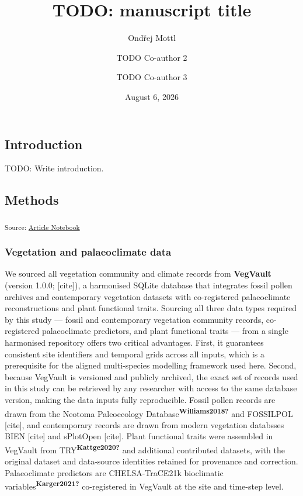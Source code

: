 \documentclass[
  12pt,
]{article}
\title{TODO: manuscript title}
\author{Ondřej Mottl \and TODO Co-author 2 \and TODO Co-author 3}
\date{August 6, 2026}
\begin{document}
\maketitle


\subsection{Introduction}\label{introduction}

TODO: Write introduction.

\subsection{Methods}\label{methods}

\textsubscript{Source:
\href{https://OndrejMottl.github.io/BIODYNAMICS-vegetation-cooccurrence/manuscript.qmd.html}{Article
Notebook}}

\subsubsection{Vegetation and palaeoclimate
data}\label{vegetation-and-palaeoclimate-data}

We sourced all vegetation community and climate records from
\textbf{VegVault} (version 1.0.0; {[}cite{]}), a harmonised SQLite
database that integrates fossil pollen archives and contemporary
vegetation datasets with co-registered palaeoclimate reconstructions and
plant functional traits. Sourcing all three data types required by this
study --- fossil and contemporary vegetation community records,
co-registered palaeoclimate predictors, and plant functional traits ---
from a single harmonised repository offers two critical advantages.
First, it guarantees consistent site identifiers and temporal grids
across all inputs, which is a prerequisite for the aligned multi-species
modelling framework used here. Second, because VegVault is versioned and
publicly archived, the exact set of records used in this study can be
retrieved by any researcher with access to the same database version,
making the data inputs fully reproducible. Fossil pollen records are
drawn from the Neotoma Paleoecology
Database\textsuperscript{\textbf{Williams2018?}} and FOSSILPOL
{[}cite{]}, and contemporary records are drawn from modern vegetation
databsses BIEN {[}cite{]} and sPlotOpen {[}cite{]}. Plant functional
traits were assembled in VegVault from
TRY\textsuperscript{\textbf{Kattge2020?}} and additional contributed
datasets, with the original dataset and data-source identities retained
for provenance and correction. Palaeoclimate predictors are
CHELSA-TraCE21k bioclimatic
variables\textsuperscript{\textbf{Karger2021?}} co-registered in
VegVault at the site and time-step level.
\end{document}
